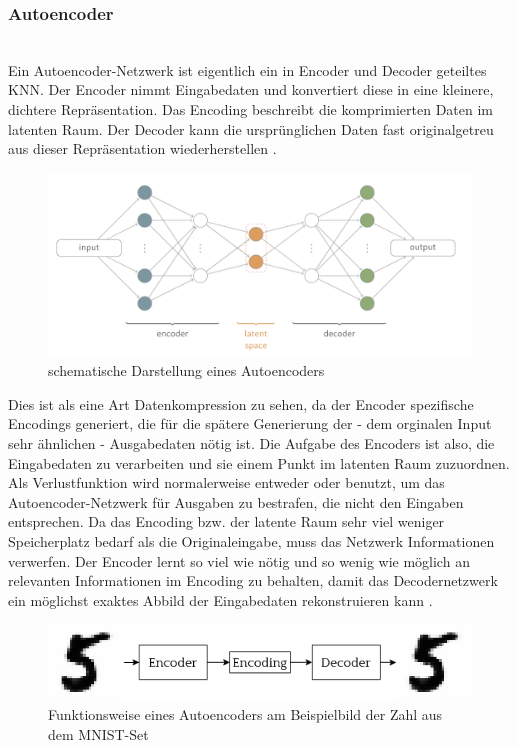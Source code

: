 \subsubsection{Autoencoder}~\\
Ein Autoencoder-Netzwerk ist eigentlich ein in Encoder und Decoder geteiltes KNN. Der Encoder nimmt Eingabedaten und konvertiert diese in eine kleinere, dichtere Repräsentation. Das Encoding beschreibt die komprimierten Daten im latenten Raum. Der Decoder kann die ursprünglichen Daten fast originalgetreu aus dieser Repräsentation wiederherstellen \cite[S.499ff]{goodl16}.
\begin{figure}[H]
    \centering
    \includegraphics[width=1.0\textwidth,angle=0]{abb/ae_spinner}
    \caption[schematische Darstellung eines Autoencoders]{schematische Darstellung eines Autoencoders \cite{Spi2018}}
\end{figure}
Dies ist als eine Art Datenkompression zu sehen, da der Encoder spezifische Encodings generiert, die für die spätere Generierung der - dem orginalen Input sehr ähnlichen - Ausgabedaten nötig ist. Die Aufgabe des Encoders ist also, die Eingabedaten zu verarbeiten und sie einem Punkt im latenten Raum zuzuordnen. Als Verlustfunktion wird normalerweise entweder  oder  benutzt, um das Autoencoder-Netzwerk für Ausgaben zu bestrafen, die nicht den Eingaben entsprechen.
Da das Encoding bzw. der latente Raum sehr viel weniger Speicherplatz bedarf als die Originaleingabe, muss das Netzwerk Informationen verwerfen. Der Encoder lernt so viel wie nötig und so wenig wie möglich an relevanten Informationen im Encoding zu behalten, damit das Decodernetzwerk ein möglichst exaktes Abbild der Eingabedaten rekonstruieren kann \cite[S.64]{fos19}.
\begin{figure}[H]
    \centering
    \includegraphics[width=1.0\textwidth,angle=0]{abb/autoencoder_standard}
    \caption[Funktionsweise eines Autoencoders]{Funktionsweise eines Autoencoders am Beispielbild der Zahl \frqq{5\flqq} aus dem MNIST-Set}
\end{figure}
